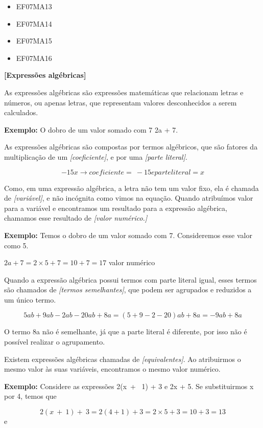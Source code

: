 \begin{itemize}
  \item EF07MA13
  \item EF07MA14
  \item EF07MA15
  \item EF07MA16
\end{itemize}

\textbf{{[}Expressões algébricas{]}}

As expressões algébricas são expressões matemáticas que relacionam
letras e números, ou apenas letras, que representam valores
desconhecidos a serem calculados.

\textbf{Exemplo:} O dobro de um valor somado com 7
\rightarrow 2a + 7.

As expressões algébricas são compostas por termos algébricos, que são
fatores da multiplicação de um \emph{{[}coeficiente{]}}, e por uma
\emph{{[}parte literal{]}}.

$$- 15x \rightarrow coeficiente = \  - 15 e parte literal = x$$

Como, em uma expressão algébrica, a letra não tem um valor fixo, ela é
chamada de \emph{{[}variável{]}}, e não incógnita como vimos na equação.
Quando atribuímos valor para a variável e encontramos um resultado para
a expressão algébrica, chamamos esse resultado de \emph{{[}valor
numérico.{]}}

\textbf{Exemplo:} Temos o dobro de um valor somado com 7. Consideremos
esse valor como 5.

$2a + 7 = 2 \times 5 + 7 = 10 + 7 = 17$ \leftarrow valor numérico

Quando a expressão algébrica possui termos com parte literal igual,
esses termos são chamados de \emph{{[}termos semelhantes{]}}, que podem
ser agrupados e reduzidos a um único termo.

$$5ab + 9ab - 2ab - 20ab + 8a = (5 + 9 - 2 - 20) ab + 8a = - 9ab + 8a$$

O termo 8a não é semelhante, já que a parte literal é diferente, por
isso não é possível realizar o agrupamento.

Existem expressões algébricas chamadas de \emph{{[}equivalentes{]}}. Ao
atribuirmos o mesmo valor às suas variáveis, encontramos o mesmo valor
numérico.

\textbf{Exemplo:} Considere as expressões 2(x\  + \ 1) + 3 e
2x + 5. Se substituirmos x por 4, temos que

$$2\left( x\  + \ 1 \right) + \ 3 = 2\left( 4 + 1 \right) + 3 = 2 \times 5 + 3 = 10 + 3 = 13$$
e 

